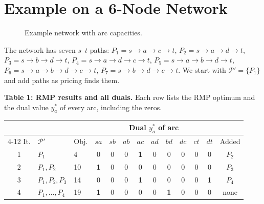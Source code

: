 \documentclass[11pt]{article}
\begin{document}
\section{Example on a 6-Node Network}
\begin{figure}[h]
\centering
{}
\caption{Example network with arc capacities.}
\end{figure}

The network has seven $s$--$t$ paths:
$P_1=s\to a\to c\to t$,\; $P_2=s\to a\to d\to t$,\; $P_3=s\to b\to d\to t$,\; $P_4=s\to a\to d\to c\to t$,\; $P_5=s\to a\to b\to d\to t$,\; $P_6=s\to a\to b\to d\to c\to t$,\; $P_7=s\to b\to d\to c\to t$.
We start with $\mathcal{P}'=\{P_1\}$ and add paths as pricing finds them.

\textbf{Table 1: RMP results and all duals.} Each row lists the RMP optimum and the dual value $y^*_a$ of every arc, including the zeros.
\begin{center}
\footnotesize
\setlength{\tabcolsep}{3.5pt}
\begin{tabular}{@{}cllcccccccccc@{}}
\toprule
 & & & \multicolumn{9}{c}{Dual $y^*_a$ of arc} & \\
\cmidrule(lr){4-12}
It. & $\mathcal{P}'$ & Obj. & $sa$ & $sb$ & $ab$ & $ac$ & $ad$ & $bd$ & $dc$ & $ct$ & $dt$ & Added \\
\midrule
1 & $P_1$ & 4 & 0 & 0 & 0 & \textbf{1} & 0 & 0 & 0 & 0 & 0 & $P_2$ \\
2 & $P_1,P_2$ & 10 & \textbf{1} & 0 & 0 & 0 & 0 & 0 & 0 & 0 & 0 & $P_3$ \\
3 & $P_1,P_2,P_3$ & 14 & 0 & 0 & 0 & \textbf{1} & 0 & 0 & 0 & 0 & \textbf{1} & $P_4$ \\
4 & $P_1,\dots,P_4$ & 19 & \textbf{1} & 0 & 0 & 0 & 0 & \textbf{1} & 0 & 0 & 0 & none \\
\bottomrule
\end{tabular}
\end{center}
\end{document}
